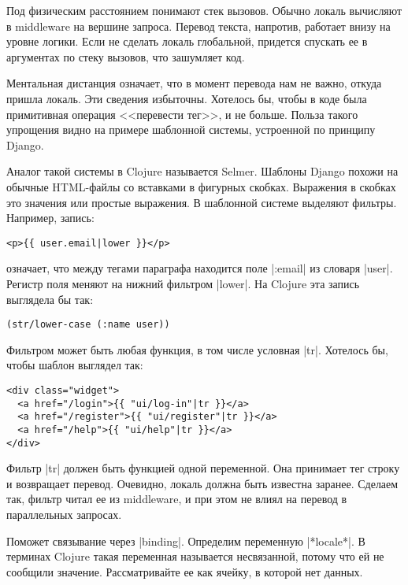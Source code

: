 
Под физическим расстоянием понимают стек вызовов. Обычно локаль вычисляют в
middleware на вершине запроса. Перевод текста, напротив, работает внизу на
уровне логики. Если не сделать локаль глобальной, придется спускать ее в
аргументах по стеку вызовов, что зашумляет код.

Ментальная дистанция означает, что в момент перевода нам не важно, откуда пришла
локаль. Эти сведения избыточны. Хотелось бы, чтобы в коде была примитивная
операция <<перевести тег>>, и не больше. Польза такого упрощения видно на
примере шаблонной системы, устроенной по принципу
Django.


Аналог такой системы в Clojure называется
Selmer. Шаблоны Django похожи на
обычные HTML-файлы со вставками в фигурных скобках. Выражения в скобках это
значения или простые выражения. В шаблонной системе выделяют фильтры. Например,
запись:

\begin{verbatim}
<p>{{ user.email|lower }}</p>
\end{verbatim}

\noindent
означает, что между тегами параграфа находится поле \spverb|:email| из словаря
\spverb|user|. Регистр поля меняют на нижний фильтром \spverb|lower|. На Clojure
эта запись выглядела бы так:

\begin{verbatim}
(str/lower-case (:name user))
\end{verbatim}

Фильтром может быть любая функция, в том числе условная \spverb|tr|. Хотелось
бы, чтобы шаблон выглядел так:

\begin{verbatim}
<div class="widget">
  <a href="/login">{{ "ui/log-in"|tr }}</a>
  <a href="/register">{{ "ui/register"|tr }}</a>
  <a href="/help">{{ "ui/help"|tr }}</a>
</div>
\end{verbatim}

Фильтр \spverb|tr| должен быть функцией одной переменной. Она принимает тег
строку и возвращает перевод. Очевидно, локаль должна быть известна
заранее. Сделаем так, фильтр читал ее из middleware, и при этом не влиял на
перевод в параллельных запросах.

Поможет связывание через \spverb|binding|. Определим переменную
\spverb|*locale*|. В терминах Clojure такая переменная называется несвязанной,
потому что ей не сообщили значение. Рассматривайте ее как ячейку, в которой нет
данных.

